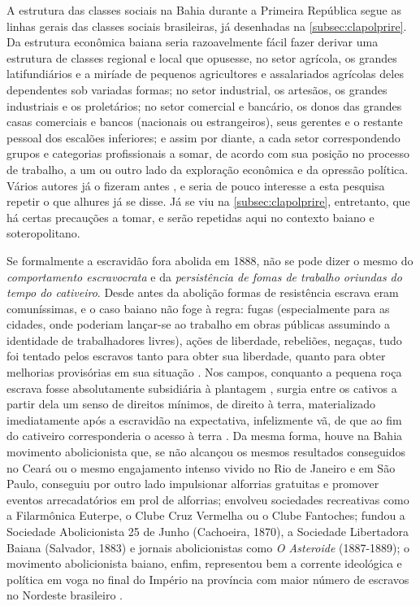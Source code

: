 A estrutura das classes sociais na Bahia durante a Primeira República segue as linhas gerais das classes sociais brasileiras, já desenhadas na \autoref{subsec:clapolprire}. Da estrutura econômica baiana seria razoavelmente fácil fazer derivar uma estrutura de classes regional e local que opusesse, no setor agrícola, os grandes latifundiários e a miríade de pequenos agricultores e assalariados agrícolas deles dependentes sob variadas formas; no setor industrial, os artesãos, os grandes industriais e os proletários; no setor comercial e bancário, os donos das grandes casas comerciais e bancos (nacionais ou estrangeiros), seus gerentes e o restante pessoal dos escalões inferiores; e assim por diante, a cada setor correspondendo grupos e categorias profissionais a somar, de acordo com sua posição no processo de trabalho, a um ou outro lado da exploração econômica e da opressão política. Vários autores já o fizeram antes \cite{castellucci_salvador_2001,CPE1980,santos_repovo_2001}, e seria de pouco interesse a esta pesquisa repetir o que alhures já se disse. Já se viu na \autoref{subsec:clapolprire}, entretanto, que há certas precauções a tomar, e serão repetidas aqui no contexto baiano e soteropolitano.

Se formalmente a escravidão fora abolida em 1888, não se pode dizer o mesmo do \textit{comportamento escravocrata} e da \textit{persistência de fomas de trabalho oriundas do tempo do cativeiro}. Desde antes da abolição formas de resistência escrava eram comuníssimas, e o caso baiano não foge à regra: fugas (especialmente para as cidades, onde poderiam lançar-se ao trabalho em obras públicas assumindo a identidade de trabalhadores livres), ações de liberdade, rebeliões, negaças, tudo foi tentado pelos escravos tanto para obter sua liberdade, quanto para obter melhorias provisórias em sua situação \cite[p.~45-52]{fraga_encruzilhadas_2014}. Nos campos, conquanto a pequena roça escrava fosse absolutamente subsidiária à plantagem \cite{gorender_escracolo_2010}, surgia entre os cativos a partir dela um senso de direitos mínimos, de direito à terra, materializado imediatamente após a escravidão na expectativa, infelizmente vã, de que ao fim do cativeiro corresponderia o acesso à terra \cite{fraga_encruzilhadas_2014}. Da mesma forma, houve na Bahia movimento abolicionista que, se não alcançou os mesmos resultados conseguidos no Ceará ou o mesmo engajamento intenso vivido no Rio de Janeiro e em São Paulo, conseguiu por outro lado impulsionar alforrias gratuitas e promover eventos arrecadatórios em prol de alforrias; envolveu sociedades recreativas como a Filarmônica Euterpe, o Clube Cruz Vermelha ou o Clube Fantoches; fundou a Sociedade Abolicionista 25 de Junho (Cachoeira, 1870), a Sociedade Libertadora Baiana (Salvador, 1883) e jornais abolicionistas como \textit{O Asteroide} (1887-1889); o movimento abolicionista baiano, enfim, representou bem a corrente ideológica e política em voga no final do Império na província com maior número de escravos no Nordeste brasileiro \cite{brito2003abolicao}.

